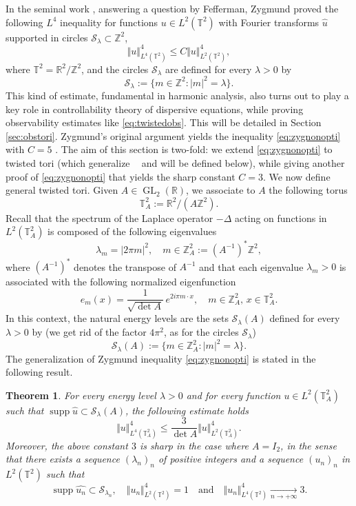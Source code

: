 \documentclass[a4paper,11pt]{amsart}
\numberwithin{equation}{section}
\newtheorem{thm}{Theorem}[section]
\theoremstyle{definition}
\DeclareMathOperator{\tori}{\mathbb T^2[\omega]}
\DeclareMathOperator{\supp}{supp}
\DeclareMathOperator{\GL}{GL}
\newcommand{\twotorus}{\mathbb T^2_A}
\begin{document}
In the seminal work \cite{Z}, answering a question by Fefferman, Zygmund proved the following $L^4$ inequality for functions $u\in L^2(\mathbb T^2)$ with Fourier transforms $\widehat u$ supported in circles $\mathcal S_{\lambda}\subset\mathbb Z^2$,
\begin{equation}\label{eq:zygnonopti}
    \Vert u\Vert^4_{L^4(\mathbb T^2)}\le C\Vert u\Vert^4_{L^2(\mathbb T^2)},
\end{equation}
where $\mathbb T^2 = \mathbb R^2/\mathbb Z^2$, and the circles $\mathcal S_{\lambda}$ are defined for every $\lambda>0$ by
\[
    \mathcal S_{\lambda} := \big\{m\in\mathbb Z^2 : \vert m\vert^2 = \lambda\big\}.
\]
This kind of estimate, fundamental in harmonic analysis, also turns out to play a key role in controllability theory of dispersive equations, while proving observability estimates like \eqref{eq:twistedobs}. This will be detailed in Section \ref{sec:obstori}. Zygmund's original argument yields the inequality \eqref{eq:zygnonopti} with $C=5$ \cite[Theorem 1]{Z}. The aim of this section is 
two-fold: we extend \eqref{eq:zygnonopti} to twisted tori (which generalize $\tori$ and will be defined below), while giving another proof of \eqref{eq:zygnonopti} that yields the sharp constant $C=3$. 
We now define general twisted tori. Given $A\in \GL_2(\mathbb R)$, we associate to $A$ the following torus
\[
    \twotorus := \mathbb R^2 /(A\mathbb Z^2).
\]
Recall that the spectrum of the Laplace operator $-\Delta$ acting on functions in $L^2(\mathbb T^2_A)$ is composed of the following eigenvalues
\begin{equation}\label{eq:eigenvalues}
    \lambda_m = \vert 2\pi m\vert^2,\quad m\in\mathbb Z^2_A:=(A^{-1})^*\mathbb Z^2,
\end{equation}
where $(A^{-1})^*$ denotes the transpose of $A^{-1}$ and that each eigenvalue $\lambda_m>0$ is associated with the following normalized eigenfunction
\[
    e_m(x) = \frac{1}{\sqrt{\det A}}\,e^{2i\pi m\cdot x},\quad m\in\mathbb Z^2_A,\, x\in\twotorus.
\]
In this context, the natural energy levels are the sets $\mathcal S_{\lambda}(A)$ defined for every $\lambda>0$ by (we get rid of the factor $4\pi^2$, as for the circles $\mathcal S_{\lambda}$)
\[
    \mathcal S_{\lambda}(A) := \big\{m\in\mathbb Z^2_A : \vert m\vert^2 = \lambda\big\}.
\]
The generalization of Zygmund inequality \eqref{eq:zygnonopti} is stated in the following result.

\begin{thm}\label{thm:zyg} For every energy level $\lambda>0$ and for every function $u\in L^2(\twotorus)$ such that $\supp\widehat{u}\subset\mathcal S_{\lambda}(A)$, the following estimate holds
\[
    \Vert u\Vert^4_{L^4(\twotorus)}\le\frac{3}{\det A}\Vert u\Vert^4_{L^2(\twotorus)}.
\]
Moreover, the above constant $3$ is sharp in the case where $A = I_2$, in the sense that there exists a sequence $(\lambda_n)_n$ of positive integers and a sequence $(u_n)_n$ in $L^2(\mathbb T^2)$ such that
\[
    \supp\widehat{u_n}\subset\mathcal S_{\lambda_n},\quad
    \Vert u_n\Vert^4_{L^2(\mathbb T^2)} = 1\quad\text{and}\quad\Vert u_n\Vert^4_{L^4(\mathbb T^2)} \underset{n\rightarrow+\infty}{\longrightarrow}3.
\]
\end{thm}
\end{document}
